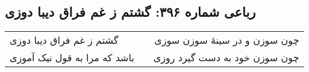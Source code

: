 \begin{center}
\section*{رباعی شماره ۳۹۶: گشتم ز غم فراق دیبا دوزی}
\label{sec:sh396}
\begin{longtable}{l p{0.5cm} r}
گشتم ز غم فراق دیبا دوزی
&&
چون سوزن و در سینهٔ سوزن سوزی
\\
باشد که مرا به قول نیک آموزی
&&
چون سوزن خود به دست گیرد روزی
\\
\end{longtable}
\end{center}
